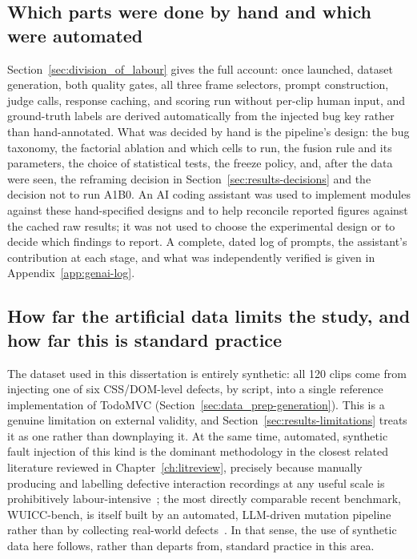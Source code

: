 \subsection{Which parts were done by hand and which were automated}
Section~\ref{sec:division_of_labour} gives the full account: once launched, dataset generation, both quality gates, all three frame selectors, prompt construction, judge calls, response caching, and scoring run without per-clip human input, and ground-truth labels are derived automatically from the injected bug key rather than hand-annotated. What was decided by hand is the pipeline's design: the bug taxonomy, the factorial ablation and which cells to run, the fusion rule and its parameters, the choice of statistical tests, the freeze policy, and, after the data were seen, the reframing decision in Section~\ref{sec:results-decisions} and the decision not to run A1B0. An AI coding assistant was used to implement modules against these hand-specified designs and to help reconcile reported figures against the cached raw results; it was not used to choose the experimental design or to decide which findings to report. A complete, dated log of prompts, the assistant's contribution at each stage, and what was independently verified is given in Appendix~\ref{app:genai-log}.

\subsection{How far the artificial data limits the study, and how far this is standard practice}
The dataset used in this dissertation is entirely synthetic: all 120 clips come from injecting one of six CSS/DOM-level defects, by script, into a single reference implementation of TodoMVC (Section~\ref{sec:data_prep-generation}). This is a genuine limitation on external validity, and Section~\ref{sec:results-limitations} treats it as one rather than downplaying it. At the same time, automated, synthetic fault injection of this kind is the dominant methodology in the closest related literature reviewed in Chapter~\ref{ch:litreview}, precisely because manually producing and labelling defective interaction recordings at any useful scale is prohibitively labour-intensive~\citep{guirobust}; the most directly comparable recent benchmark, WUICC-bench, is itself built by an automated, LLM-driven mutation pipeline rather than by collecting real-world defects~\citep{zhang2026beyond}. In that sense, the use of synthetic data here follows, rather than departs from, standard practice in this area.

